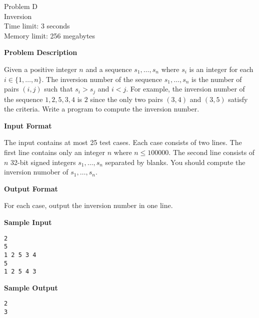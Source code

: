 \documentclass[11pt]{article}
\begin{document}
\begin{center}
    {\LARGE Problem D}\\
    {\Large Inversion}\\
    {Time limit: 3 seconds}\\
    {Memory limit: 256 megabytes}
\end{center}

\textbf{\large Problem Description}

Given a positive integer $n$ and a sequence $s_1,\dots,s_n$ where $s_i$ is an
integer for each $i\in\{1,\dots,n\}$.
The inversion number of the sequence $s_1,\dots,s_n$ is the number of pairs
$(i,j)$ such that $s_i>s_j$ and $i<j$. For example, the inversion number of
the sequence $1,2,5,3,4$ is $2$ since the only two pairs $(3,4)$ and $(3,5)$
satisfy the criteria. Write a program to compute the inversion number.

\textbf{\large Input Format}

The input contains at most 25 test cases. 
Each case consists of two lines. The first line contains only an integer $n$ where $n\le 100000$. 
The second line consists of $n$ 32-bit signed integers 
$s_1,\dots,s_n$ separated by blanks.
You should compute the inversion numober of $s_1,\dots,s_n$.

\textbf{\large Output Format}

For each case, output the inversion number in one line.

\textbf{\large Sample Input}

\begin{verbatim}
2
5
1 2 5 3 4
5
1 2 5 4 3
\end{verbatim}

\textbf{\large Sample Output}
\begin{verbatim}
2
3
\end{verbatim}
\end{document}
